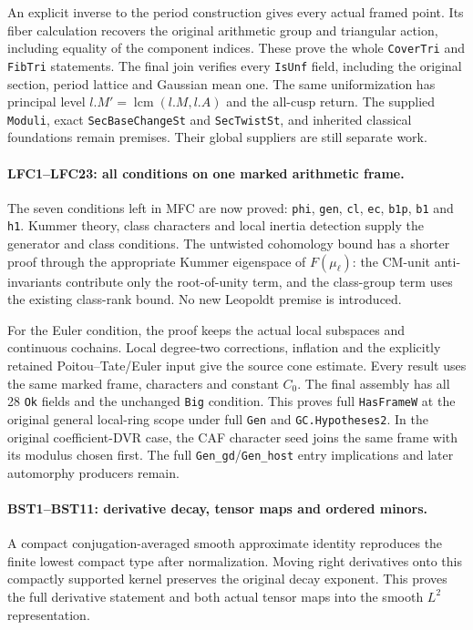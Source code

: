 An explicit inverse to the period construction gives every actual
framed point. Its fiber calculation recovers the original arithmetic
group and triangular action, including equality of the component
indices. These prove the whole \texttt{Cover\allowbreak Tri} and \texttt{Fib\allowbreak Tri}
statements. The final join verifies every \texttt{Is\allowbreak Unf} field,
including the original section, period lattice and Gaussian mean one.
The same uniformization has principal level
$l.M'=\operatorname{lcm}(l.M,l.A)$ and the all-cusp return.
The supplied \texttt{Moduli}, exact \texttt{Sec\allowbreak Base\allowbreak Change\allowbreak St} and
\texttt{Sec\allowbreak Twist\allowbreak St}, and inherited classical foundations remain
premises. Their global suppliers are still separate work.

\paragraph{LFC1--LFC23: all conditions on one marked arithmetic frame.}
The seven conditions left in MFC are now proved:
\texttt{phi}, \texttt{gen}, \texttt{cl}, \texttt{ec},
\texttt{b1p}, \texttt{b1} and \texttt{h1}.
Kummer theory, class characters and local inertia detection supply
the generator and class conditions. The untwisted cohomology bound
has a shorter proof through the appropriate Kummer eigenspace of
$F(\mu_\ell)$: the CM-unit anti-invariants contribute only the
root-of-unity term, and the class-group term uses the existing
class-rank bound. No new Leopoldt premise is introduced.

For the Euler condition, the proof keeps the actual local subspaces
and continuous cochains. Local degree-two corrections, inflation
and the explicitly retained Poitou--Tate/Euler input give the
source cone estimate. Every result uses the same marked frame,
characters and constant $C_0$. The final assembly has all 28
\texttt{Ok} fields and the unchanged \texttt{Big} condition.
This proves full \texttt{Has\allowbreak Frame\allowbreak W} at the original general
local-ring scope under full \texttt{Gen} and
\texttt{GC.\allowbreak Hypotheses2}. In the original coefficient-DVR case,
the CAF character seed joins the same frame with its modulus
chosen first. The full \texttt{Gen\_\allowbreak gd}/\texttt{Gen\_\allowbreak host}
entry implications and later automorphy producers remain.

\paragraph{BST1--BST11: derivative decay, tensor maps and ordered minors.}
A compact conjugation-averaged smooth approximate identity reproduces
the finite lowest compact type after normalization. Moving right
derivatives onto this compactly supported kernel preserves the
original decay exponent. This proves the full derivative statement
and both actual tensor maps into the smooth $L^2$ representation.

